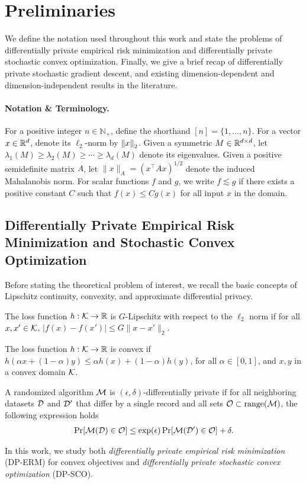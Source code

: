 \section{Preliminaries}
We define the notation used throughout this work and state the problems of differentially private empirical risk minimization and differentially private stochastic convex optimization.
Finally, we give a brief recap of differentially private stochastic gradient descent, and existing dimension-dependent and dimension-independent results in the literature.

\paragraph{Notation \& Terminology.} 
For a positive integer $n \in \mathbb{N}_+$, define the shorthand $[n] = \{1, \dots, n\}$.
For a vector $x \in \mathbb{R}^d$, denote its $\ell_2$-norm by $\left\lVert x\right\rVert_2$.
Given a symmetric $M \in \mathbb{R}^{d \times d}$, let $\lambda_1(M) \ge \lambda_2(M) \ge \cdots \ge \lambda_d(M)$ denote its eigenvalues.
Given a positive semidefinite matrix $A$, let $\| x \|_A = (x^\top A x)^{1/2}$ denote the induced Mahalanobis norm.
For scalar functions $f$ and $g$, we write $f \lesssim g$ if there exists a positive constant $C$ such that $f(x) \leq C g(x)$ for all input $x$ in the domain.

\subsection{Differentially Private Empirical Risk Minimization and Stochastic Convex Optimization}
Before stating the theoretical problem of interest, we recall the basic concepts of Lipschitz continuity, convexity, and approximate differential privacy.
\begin{defi}
The loss function $h:\mathcal K\to\mathbb{R}$ is $G$-Lipschitz with respect to the $\ell_2$ norm if for all $x,x' \in \mathcal K$, $|f(x)-f(x')|\leq G\|x-x'\|_2$.
\end{defi}

\begin{defi}[Convexity]
The loss function $h:\mathcal K\to\mathbb{R}$ is convex if $h(\alpha x + (1 - \alpha) y) \le \alpha h(x) + (1 - \alpha) h(y)$, for all $\alpha \in [0, 1]$, and $x, y$ in a convex domain $\mathcal K$.
\end{defi}

\begin{defi}
A randomized algorithm $\mathcal M$ is $(\epsilon,\delta)$-differentially private if for all neighboring datasets $\mathcal D$ and $\mathcal D'$ that differ by a single record and all sets $\mathcal O\subset\mathrm{range}(\mathcal M)$, the following expression holds
\begin{align*}
    \Pr[\mathcal M(\mathcal D)\in \mathcal O]\le \exp ({\epsilon}) \Pr[\mathcal M(\mathcal D')\in \mathcal O]+\delta.
\end{align*}
\end{defi}
In this work, we study both \emph{differentially private empirical risk minimization} (DP-ERM) for convex objectives and \emph{differentially private stochastic convex optimization} (DP-SCO).

